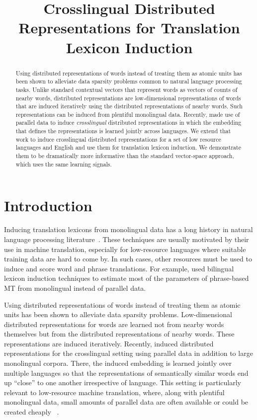 \documentclass[11pt]{article}
\title{Crosslingual Distributed Representations for Translation Lexicon Induction}
\date{}
\begin{document}
\maketitle
\begin{abstract}
Using distributed representations of words instead of treating them as atomic units has been shown to alleviate data sparsity problems common to natural language processing tasks.  
Unlike standard contextual vectors that represent words as vectors of counts of nearby words, distributed representations are low-dimensional representations of words that are induced iteratively using the distributed representations of nearby words.  
Such representations can be induced from plentiful monolingual data.  
Recently,  made use of parallel data to induce {\it crosslingual} distributed representations in which the embedding that defines the representations is learned jointly across languages. 
We extend that work to induce crosslingual distributed representations for a set of low resource languages and English and use them for translation lexicon induction.  
We demonstrate them to be dramatically more informative than the standard vector-space approach, which uses the same learning signals.
\end{abstract}

\section{Introduction} \label{sect:intro}
Inducing translation lexicons from monolingual data has a long history in natural language processing literature~\cite{rapp95,fung98,schafer02,koehn02}.  
These techniques are usually motivated by their use in machine translation, especially for low-resource languages where suitable training data are hard to come by.
In such cases, other resources must be used to induce and score word and phrase translations.  
For example,  used bilingual lexicon induction techniques to estimate most of the parameters of phrase-based MT \cite{koehn03phrasebased} from monolingual instead of parallel data.

Using distributed representations of words instead of treating them as atomic units has been shown to alleviate data sparsity problems.  
Low-dimensional distributed representations for words are learned not from nearby words themselves but from the distributed representations of nearby words.
These representations are induced iteratively.
Recently,  induced distributed representations for the crosslingual setting using parallel data in addition to large monolingual corpora.  
There, the induced embedding is learned jointly over multiple languages so that 
the representations of semantically similar words end up ``close'' to one another irrespective of language.  
This setting is particularly relevant to low-resource machine translation, where, along with plentiful monolingual data, small amounts of parallel data are often available or could be created cheaply ~\cite{post2012}.
\end{document}

